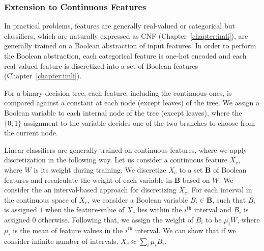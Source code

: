 \subsubsection{Extension to Continuous Features}
In practical problems, features are generally real-valued or categorical but classifiers, which are naturally expressed as CNF (Chapter~\ref{chapter:imli}), are generally trained on a Boolean abstraction of input features. In order to perform the Boolean abstraction, each categorical feature is one-hot encoded and each real-valued feature is discretized into a set of Boolean features (Chapter~\ref{chapter:imli}). 

For a binary decision tree, each feature, including the continuous ones, is compared against a constant at each node (except leaves) of the tree. We assign a Boolean variable to each internal node of the tree (except leaves), where the $ \{0,1\} $ assignment to the variable decides one of the two branches to choose from the current node.  

Linear classifiers are generally trained on continuous features, where we apply discretization in the following way. Let us consider a continuous feature $X_c$, where $W$ is its weight during training. We discretize $ X_c $ to a set $ \mathbf{B} $ of Boolean features and recalculate the weight of each variable in $ \mathbf{B} $ based on $ W $. We consider the an interval-based approach for discretizing $ X_c $. For each interval in the continuous space of $X_c$, we consider a Boolean variable $B_i \in \mathbf{B}$, such that $ B_i $ is assigned $ 1 $ when the feature-value of $X_c$ lies within the $i^{\mathrm{th}}$ interval and $ B_i $ is assigned $ 0 $ otherwise. Following that, we assign the weight of $ B_i $ to be $ \mu_iW $, where $ \mu_i $ is the mean of feature values in the $i^{\mathrm{th}}$ interval. We can show that if we consider infinite number of intervals, $ X_c \approx \sum_i \mu_i B_i $. 



